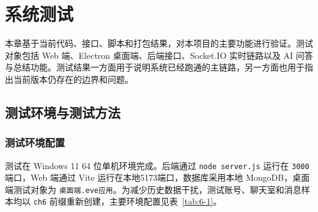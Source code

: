 \chapter{系统测试}

\newcommand{\testcaseheaderrow}{%
\textbf{用例编号} & \textbf{测试功能} & \textbf{操作步骤} & \textbf{预期结果} & \textbf{实际结果} \\}
\newcommand{\testcasecontinuedmark}{%
\multicolumn{5}{r}{续表\arabic{chapter}-\arabic{table}}\\[0.35em]}
\newcommand{\testcaselongtablehead}[2]{%
\caption{#1}
\label{#2}\\
\toprule
\testcaseheaderrow
\midrule
\endfirsthead
\testcasecontinuedmark
\toprule
\testcaseheaderrow
\midrule
\endhead
\bottomrule
\endfoot
\bottomrule
\endlastfoot
}
\newcommand{\resourceusageheaderrow}{%
\textbf{测试场景} & \textbf{持续时间} & \textbf{平均CPU占用} & \textbf{工作集内存} & \textbf{私有内存} & \textbf{结果分析} \\}
\newcommand{\resourceusagecontinuedmark}{%
\multicolumn{6}{r}{续表\arabic{chapter}-\arabic{table}}\\[0.35em]}
\newcommand{\resourceusagelongtablehead}[2]{%
\caption{#1}
\label{#2}\\
\toprule
\resourceusageheaderrow
\midrule
\endfirsthead
\resourceusagecontinuedmark
\toprule
\resourceusageheaderrow
\midrule
\endhead
\bottomrule
\endfoot
\bottomrule
\endlastfoot
}

本章基于当前代码、接口、脚本和打包结果，对本项目的主要功能进行验证。测试对象包括 Web 端、Electron 桌面端、后端接口、Socket.IO 实时链路以及 AI 问答与总结功能。测试结果一方面用于说明系统已经跑通的主链路，另一方面也用于指出当前版本仍存在的边界和问题。

\section{测试环境与测试方法}

\subsection{测试环境配置}

测试在 Windows 11 64 位单机环境完成。后端通过 \texttt{node server.js} 运行在 \texttt{3000} 端口，Web 端通过 Vite 运行在本地5173端口，数据库采用本地 MongoDB，桌面端测试对象为 \texttt{桌面端.eve应用}。为减少历史数据干扰，测试账号、聊天室和消息样本均以 \texttt{ch6} 前缀重新创建，主要环境配置见表~\ref{tab:6-1}。

